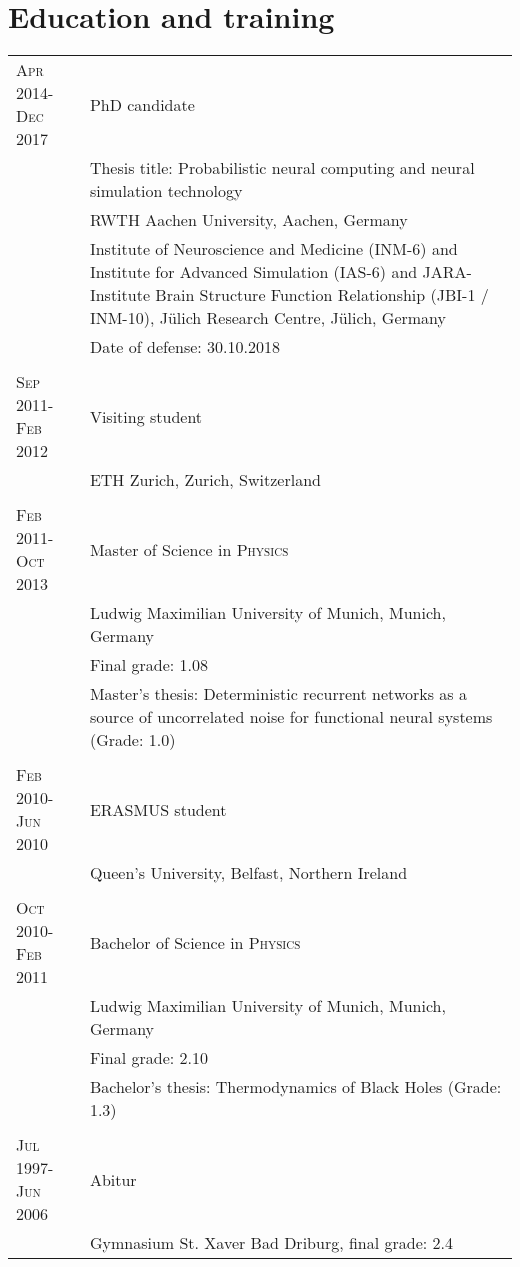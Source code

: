 \section{Education and training}

\begin{longtable}{>{\hfill}p{3.15cm}|p{10.4cm}}
  \textsc{Apr} 2014-\textsc{Dec} 2017 & PhD candidate \\
  & \footnotesize Thesis title: Probabilistic neural computing and neural simulation technology \\
  & \footnotesize RWTH Aachen University, Aachen, Germany \\
  & \footnotesize Institute of Neuroscience and Medicine (INM-6) and Institute for Advanced Simulation (IAS-6) and JARA-Institute Brain Structure Function Relationship (\mbox{JBI-1} / INM-10), J\"ulich Research Centre, J\"ulich, Germany \\
  & \footnotesize Date of defense: 30.10.2018 \\
  \multicolumn{2}{c}{} \\
  \textsc{Sep} 2011-\textsc{Feb} 2012 & Visiting student \\
  & \footnotesize{ETH Zurich, Zurich, Switzerland} \\
  \multicolumn{2}{c}{} \\
  \textsc{Feb} 2011-\textsc{Oct} 2013 & Master of Science in \textsc{Physics} \\
  & \footnotesize Ludwig Maximilian University of Munich, Munich, Germany \\
  & \footnotesize Final grade: 1.08 \\
  & \footnotesize Master's thesis: Deterministic recurrent networks as
  a source of uncorrelated noise for
  functional neural systems (Grade: 1.0) \\
  \multicolumn{2}{c}{} \\
  \textsc{Feb} 2010-\textsc{Jun} 2010 & ERASMUS student \\
  & \footnotesize Queen's University, Belfast, Northern Ireland \\
  \multicolumn{2}{c}{} \\
  \textsc{Oct} 2010-\textsc{Feb} 2011 & Bachelor of Science in \textsc{Physics} \\
  & \footnotesize Ludwig Maximilian University of Munich, Munich, Germany \\
  & \footnotesize Final grade: 2.10 \\
  & \footnotesize Bachelor's thesis: Thermodynamics of Black Holes (Grade: 1.3) \\
  \multicolumn{2}{c}{} \\
  \textsc{Jul} 1997-\textsc{Jun} 2006 & Abitur \\
  & \footnotesize Gymnasium St. Xaver Bad Driburg, final grade: 2.4
\end{longtable}
